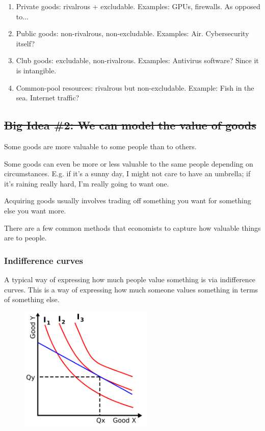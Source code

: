 \documentclass[11pt]{article}
\begin{document}
\begin{enumerate}
    \item Private goods: rivalrous + excludable. Examples: GPUs, firewalls. As opposed to...
    \item Public goods: non-rivalrous, non-excludable. Examples: Air. Cybersecurity itself?
    \item Club goods: excludable, non-rivalrous. Examples: Antivirus software? Since it is intangible. 
    \item Common-pool resources: rivalrous but non-excludable. Example: Fish in the sea. Internet traffic?
\end{enumerate}

\subsection{\sout{Big Idea \#2: We can model the value of goods}}

Some goods are more valuable to some people than to others.

Some goods can even be more or less valuable to the same people depending on circumstances.
E.g. if it's a sunny day, I might not care to have an umbrella; if it's raining really hard, I'm really going to want one. 

Acquiring goods usually involves trading off something you want for something else you want more. 

There are a few common methods that economists to capture how valuable things are to people.

\subsubsection{Indifference curves}

A typical way of expressing how much people value something is via indifference curves. This is a way of expressing how much someone values something in terms of something else. 

\begin{figure}[h]
    \centering
    \includegraphics*[width=2.5in]{indifference.png}
\end{figure}
 
\end{document}
